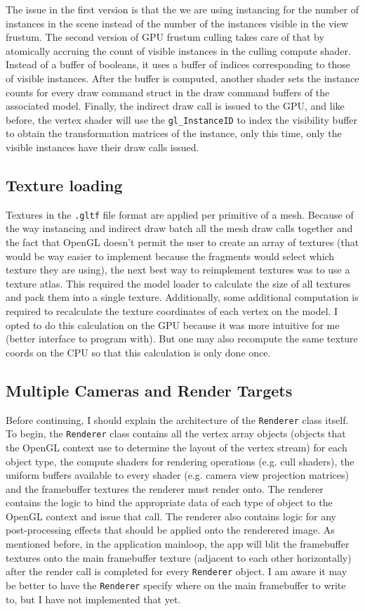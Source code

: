\documentclass[letterpaper, 10 pt, conference]{ieeeconf}  %
\begin{document}
The issue in the first version is that the we are using instancing for the number of instances in the scene instead of the number of the instances visible in the view frustum. The second version of GPU frustum culling takes care of that by atomically accruing the count of visible instances in the culling compute shader. Instead of a buffer of booleans, it uses a buffer of indices corresponding to those of visible instances. After the buffer is computed, another shader sets the instance counts for every draw command struct in the draw command buffers of the associated model. Finally, the indirect draw call is issued to the GPU, and like before, the vertex shader will use the \texttt{gl\_InstanceID} to index the visibility buffer to obtain the transformation matrices of the instance, only this time, only the visible instances have their draw calls issued.


\subsection{Texture loading}
Textures in the \texttt{.gltf} file format are applied per primitive of a mesh. Because of the way instancing and indirect draw batch all the mesh draw calls together and the fact that OpenGL doesn't permit the user to create an array of textures (that would be way easier to implement because the fragments would select which texture they are using), the next best way to reimplement textures was to use a texture atlas. This required the model loader to calculate the size of all textures and pack them into a single texture. Additionally, some additional computation is required to recalculate the texture coordinates of each vertex on the model. I opted to do this calculation on the GPU because it was more intuitive for me (better interface to program with). But one may also recompute the same texture coords on the CPU so that this calculation is only done once. 

\subsection {Multiple Cameras and Render Targets}
Before continuing, I should explain the architecture of the \texttt{Renderer} class itself. To begin, the \texttt{Renderer} class contains all the vertex array objects (objects that the OpenGL context use to determine the layout of the vertex stream) for each object type, the compute shaders for rendering operations (e.g. cull shaders), the uniform buffers available to every shader (e.g. camera view projection matrices) and the framebuffer textures the renderer must render onto. The renderer contains the logic to bind the appropriate data of each type of object to the OpenGL context and issue that call. The renderer also contains logic for any post-processing effects that should be applied onto the renderered image. As mentioned before, in the application mainloop, the app will blit the framebuffer textures onto the main framebuffer texture (adjacent to each other horizontally) after the render call is completed for every \texttt{Renderer} object. I am aware it may be better to have the \texttt{Renderer} specify where on the main framebuffer to write to, but I have not implemented that yet. 
\end{document}
